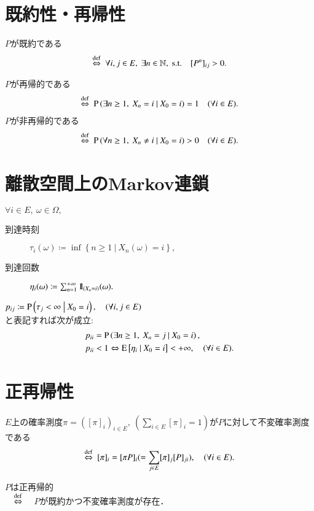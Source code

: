 \section{既約性・再帰性}
	\begin{dfn}[既約性]
		$P$が既約である
		\begin{align}
			\overset{\mathrm{def}}{\Leftrightarrow}\ \forall i, j \in E,\ \exists n \in \mathbb{N},\ \mathrm{s.t. \quad} [P^n]_{ij} > 0.
		\end{align}
	\end{dfn}
	\begin{dfn}[再帰性]
		$P$が再帰的である
		\begin{align}
			\overset{\mathrm{def}}{\Leftrightarrow}\ \operatorname{P} \left( \exists n \geq 1,\ X_n = i \ \middle|\ X_0 = i \right) = 1 \quad(\forall i \in E).
		\end{align}
		$P$が非再帰的である
		\begin{align}
			\overset{\mathrm{def}}{\Leftrightarrow}\ \operatorname{P} \left( \forall n \geq 1,\ X_n \neq i \ \middle|\ X_0 = i \right) > 0 \quad(\forall i \in E).
		\end{align}
	\end{dfn}
	
\section{離散空間上のMarkov連鎖}
	\begin{dfn}[到達時刻と到達回数]
		$\forall i \in E,\ \omega \in \Omega,$
		\begin{description}
			\item[到達時刻] $\tau_i(\omega) \coloneqq \inf{}{\left\{ n \geq 1\ \left|\ X_n(\omega) = i \right.\right\}},$
			\item[到達回数] $\eta_i(\omega) \coloneqq \sum_{n=1}^{+\infty} \mbox{1}\hspace{-0.25em}\mbox{l}_{(X_n = i)}(\omega).$
		\end{description}
	\end{dfn}
	$p_{ij} \coloneqq \operatorname{P} \left( \tau_j < \infty \ \middle|\ X_0 = i \right), \quad (\forall i,j \in E)$\\
	と表記すれば次が成立:
	\begin{align}
		p_{ii} &= \operatorname{P} \left( \exists n \geq 1,\ X_n = j \ \middle|\ X_0 = i \right), \\
		p_{ii} &< 1 \Leftrightarrow \operatorname{E} \left[ \eta_i \ \middle|\ X_0 = i \right] < +\infty, \quad (\forall i \in E).
	\end{align}

\section{正再帰性}
	\begin{dfn}[不変確率測度]
		$E$上の確率測度$\pi = ([\pi]_i)_{i \in E},\ (\sum_{i \in E} [\pi]_i = 1)$が$P$に対して不変確率測度である
		\begin{align}
			\overset{\mathrm{def}}{\Leftrightarrow}\ [\pi]_i = [\pi P]_i ( = \sum_{j \in E}[\pi]_j [P]_{ji} ), \quad (\forall i \in E).
		\end{align}
	\end{dfn}
	\begin{dfn}[正再帰性]
		$P$は正再帰的 \\
		$\quad\overset{\mathrm{def}}{\Leftrightarrow}\quad$ $P$が既約かつ不変確率測度が存在． 
	\end{dfn}
